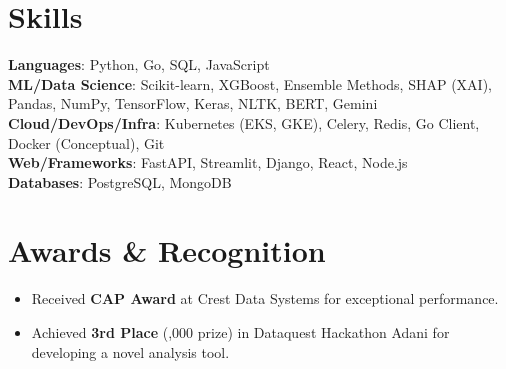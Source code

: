 \documentclass[letterpaper,11pt]{article}
\newcommand{\resumeItem}[1]{
  \item\small{
    {#1 \vspace{-2pt}}
  }
}
\newcommand{\resumeSubHeadingListStart}{\begin{itemize}[leftmargin=0.15in, label={}]}
\newcommand{\resumeSubHeadingListEnd}{\end{itemize}}
\newcommand{\resumeItemListStart}{\begin{itemize}}
\newcommand{\resumeItemListEnd}{\end{itemize}\vspace{-5pt}}
\begin{document}
\section{Skills}
 \begin{itemize}[leftmargin=0.15in, label={}]
    \small{\item{
        \textbf{Languages}{: Python, Go, SQL, JavaScript} \\
        \textbf{ML/Data Science}{: Scikit-learn, XGBoost, Ensemble Methods, SHAP (XAI), Pandas, NumPy, TensorFlow, Keras, NLTK, BERT, Gemini} \\
        \textbf{Cloud/DevOps/Infra}{: Kubernetes (EKS, GKE), Celery, Redis, Go Client, Docker (Conceptual), Git} \\
        \textbf{Web/Frameworks}{: FastAPI, Streamlit, Django, React, Node.js} \\
        \textbf{Databases}{: PostgreSQL, MongoDB}
    }}
 \end{itemize}

\section{Awards \& Recognition}
    \resumeItemListStart
        \resumeItem{Received \textbf{CAP Award} at Crest Data Systems for exceptional performance.}
        \resumeItem{Achieved \textbf{3rd Place} (,000 prize) in Dataquest Hackathon \@ Adani for developing a novel analysis tool.}
    \resumeItemListEnd

\end{document}
